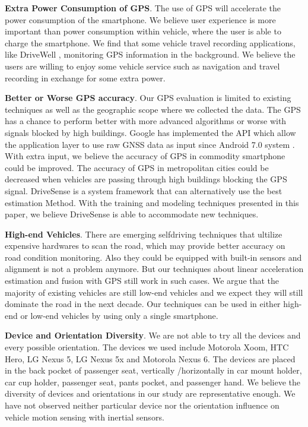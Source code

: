 
\textbf{Extra Power Consumption of GPS}. 
The use of GPS will accelerate the power consumption of the smartphone. 
We believe user experience is more important
than power consumption within vehicle, 
where the user is able to charge the smartphone. 
We find that some vehicle travel recording applications, like DriveWell \cite{cmt} , monitoring GPS information
in the background. 
We believe the users are willing to enjoy some 
vehicle service such as navigation and travel recording
in exchange for some extra power.  



\textbf{Better or Worse GPS accuracy}. 
Our GPS evaluation is limited to existing techniques as well as the
geographic scope where we collected the data. 
The GPS has a chance to perform better with more advanced algorithms
or worse with signals blocked by high buildings. 
Google has implemented the API which allow the application layer to use raw GNSS data as input
since Android 7.0 system \cite{android_gnss, google_gnss_tools}.
With extra input, we believe the accuracy of GPS in commodity 
smartphone could be improved. 
The accuracy of GPS in metropolitan cities could be decreased when vehicles are passing through high buildings blocking the GPS signal.
DriveSense is a system framework that can alternatively use the best estimation
Method.
With the training and modeling techniques presented in this paper, 
we believe DriveSense is able to accommodate new techniques.  

\textbf{High-end Vehicles}. 
There are emerging selfdriving techniques that ultilize 
expensive hardwares to scan the road, 
which may provide better accuracy on road condition
monitoring. 
Also they could be equipped with built-in sensors
and alignment is not a problem anymore. 
But our techniques about linear acceleration
estimation and fusion with GPS still work
in such cases. 
We argue that the majority of existing
vehicles are still low-end vehicles 
and we expect they will still dominate 
the road in the next decade. 
Our techniques can be used in either high-end 
or low-end vehicles by using only
a single smartphone. 


\textbf{Device and Orientation Diversity}. 
We are not able to try all the devices and 
every possible orientation. 
The devices we used include Motorola Xoom,
HTC Hero, LG Nexus 5, LG Nexus 5x and Motorola Nexus 6. 
The devices are placed in the back pocket of passenger
seat, vertically /horizontally in car mount holder, 
car cup holder, passenger seat, pants pocket, 
and passenger hand.  
We believe the diversity of devices and orientations in our study are representative enough. 
We have not observed neither particular device nor 
the orientation influence on vehicle motion sensing
with inertial sensors. 



